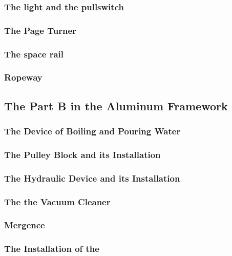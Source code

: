 \documentclass[twoside,a4paper]{refart}
\begin{document}
\subsubsection{The light and the pullswitch}
\subsubsection{The Page Turner}
\subsubsection{The space rail}
\subsubsection{Ropeway}
\subsection{The Part B in the Aluminum Framework}
\subsubsection{The Device of Boiling and Pouring Water}
\subsubsection{The Pulley Block and its Installation}
\subsubsection{The Hydraulic Device and its Installation}
\subsubsection{The the Vacuum Cleaner}
\subsubsection{Mergence}
\subsubsection{The Installation of the}
\end{document}
